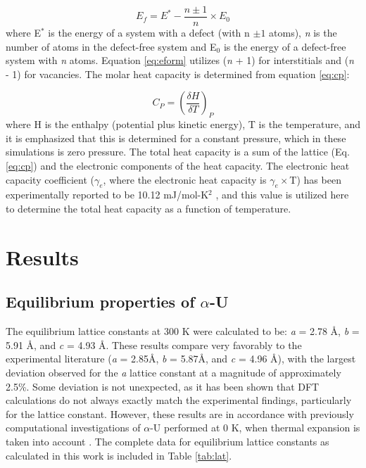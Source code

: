 \documentclass[utf8]{frontiersSCNS} %
\begin{document}
\begin{equation}
\label{eq:eform}
E_f = E^* - \frac{n \pm 1}{n} \times E_0
\end{equation}where E$^{*}$ is the energy of a system with a defect (with n $\pm 1$ atoms), \textit{n} is the number of atoms in the defect-free system and E$_{0}$ is the energy of a defect-free system with \textit{n} atoms. Equation \ref{eq:eform} utilizes (\textit{n} + 1) for interstitials and (\textit{n} - 1) for vacancies. The molar heat capacity is determined from equation \ref{eq:cp}:

\begin{equation}
\label{eq:cp}
C_{P} = \left(\frac{\delta H}{\delta T}\right)_{P}
\end{equation}where H is the enthalpy (potential plus kinetic energy), T is the temperature, and it is emphasized that this is determined for a constant pressure, which in these simulations is zero pressure. The total heat capacity is a sum of the lattice (Eq. \ref{eq:cp}) and the electronic components of the heat capacity. The electronic heat capacity coefficient ($\gamma_e$, where the electronic heat capacity is $\gamma_e\times$T) has been experimentally reported to be 10.12 mJ/mol-K$^2$ \cite{marchidan1976, schachinger1989} , and this value is utilized here to determine the total heat capacity as a function of temperature. 

\section{Results}

\subsection{Equilibrium properties of $\alpha$-U}

The equilibrium lattice constants at 300 K were calculated to be: \textit{a} = 2.78 \AA, \textit{b} = 5.91 \AA, and \textit{c} = 4.93 \AA. These results compare very favorably to the experimental literature (\textit{a} = 2.85\AA, \textit{b} = 5.87\AA, and \textit{c} = 4.96 \AA \cite{lawson1988}), with the largest deviation observed for the \textit{a} lattice constant at a magnitude of approximately 2.5\%. Some deviation is not unexpected, as it has been shown that DFT calculations do not always exactly match the experimental findings, particularly for the lattice constant. However, these results are in accordance with previously computational investigations of $\alpha$-U performed at 0 K, when thermal expansion is taken into account \cite{wirth2011,beeler2013}. The complete data for equilibrium lattice constants as calculated in this work is included in Table \ref{tab:lat}. 
\end{document}

